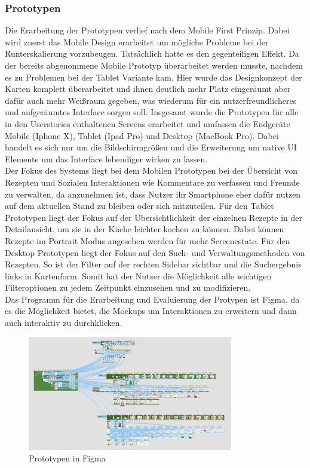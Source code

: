 \subsubsection{Prototypen}
Die Erarbeitung der Prototypen verlief nach dem Mobile First Prinzip. Dabei wird zuerst das Mobile Design erarbeitet um mögliche Probleme bei der Runterskalierung vorzubeugen. Tatsächlich hatte es den gegenteiligen Effekt. Da der bereits abgenommene Mobile Prototyp überarbeitet werden musste, nachdem es zu Problemen bei der Tablet Variante kam. Hier wurde das Designkonzept der Karten komplett überarbeitet und ihnen deutlich mehr Platz eingeräumt aber dafür auch mehr Weißraum gegeben, was wiederum für ein nutzerfreundlicheres und aufgeräumtes Interface sorgen soll. Insgesamt wurde die Prototypen für alle in den Userstories enthaltenen Screens erarbeitet und umfassen die Endgeräte Mobile (Iphone X), Tablet (Ipad Pro) und Desktop (MacBook Pro). Dabei handelt es sich nur um die Bildschirmgrößen und die Erweiterung um native UI Elemente um das Interface lebendiger wirken zu lassen. \\
Der Fokus des Systems liegt bei dem Mobilen Prototypen bei der Übersicht von Rezepten und Sozialen Interaktionen wie Kommentare zu verfassen und Freunde zu verwalten, da anzunehmen ist, dass Nutzer ihr Smartphone eher dafür nutzen auf dem aktuellen Stand zu bleiben oder sich mitzuteilen. Für den Tablet Prototypen liegt der Fokus auf der Übersichtlichkeit der einzelnen Rezepte in der Detailansicht, um sie in der Küche leichter kochen zu können. Dabei können Rezepte im Portrait Modus angesehen werden für mehr Screenestate. Für den Desktop Prototypen liegt der Fokus auf den Such- und Verwaltungsmethoden von Rezepten. So ist der Filter auf der rechten Sidebar sichtbar und die Suchergebnis links in Kartenform. Somit hat der Nutzer die Möglichkeit alle wichtigen Filteroptionen zu jedem Zeitpunkt einzusehen und zu modifizieren. \\
Das Programm für die Erarbeitung und Evaluierung der Protypen ist Figma, da es die Möglichkeit bietet, die Mockups um Interaktionen zu erweitern und dann auch interaktiv zu durchklicken. \\
\begin{figure}[h] %
    \center
    \includegraphics[width=0.8\textwidth]{images/prototyping.png}
    \caption[Prototypen in Figma]{Prototypen in Figma}
    \label{fig:prototyping}
\end{figure}


